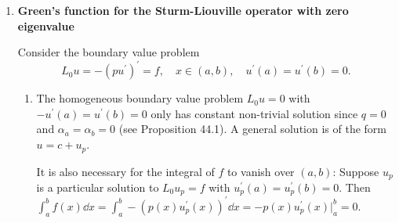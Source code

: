 \documentclass[11pt]{article}
\begin{document}
\begin{enumerate}[label=\textbf{\arabic*.}]
    \item \textbf{Green's function for the Sturm-Liouville operator with zero eigenvalue}
    
    Consider the boundary value problem \[L_0u = -(pu^\prime)^\prime = f,\quad x\in(a,b),\quad u^\prime(a) = u^\prime(b) = 0.\]
    \begin{enumerate}[label=\textsf{(\roman*)}]
        \item The homogeneous boundary value problem $L_0u = 0$ with $-u^\prime(a) = u^\prime(b) = 0$ only has constant non-trivial solution since $q = 0$ and $\alpha_a = \alpha_b = 0$ (see Proposition 44.1). A general solution is of the form $u = c+u_p$.
        
        It is also necessary for the integral of $f$ to vanish over $(a,b)$: Suppose $u_p$ is a particular solution to $L_0u_p = f$ with $u_p^\prime(a) = u_p^\prime(b) = 0$. Then $\int_a^b f(x) \dd x = \int_a^b -(p(x)u^\prime_p(x))^\prime\dd x = -p(x)u^\prime_p(x)\big|_a^b = 0$.


\end{enumerate}
\end{enumerate}
\end{document}
